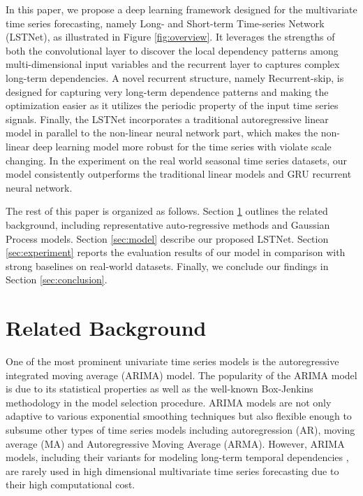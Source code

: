 \documentclass[sigconf]{acmart}
\begin{document}
In this paper, we propose a deep learning framework designed for the multivariate time series forecasting, namely Long- and Short-term Time-series Network (LSTNet), as illustrated in Figure \ref{fig:overview}. It leverages the strengths of both the convolutional layer to discover the local dependency patterns among multi-dimensional input variables and the recurrent layer to captures complex long-term dependencies. A novel recurrent structure, namely Recurrent-skip, is designed for capturing very long-term dependence patterns and making the optimization easier as it utilizes the periodic property of the input time series signals. Finally, the LSTNet incorporates a traditional autoregressive linear model in parallel to the non-linear neural network part, which makes the non-linear deep learning model more robust for the time series with violate scale changing. In the experiment on the real world seasonal time series datasets, our model consistently outperforms the traditional linear models and GRU recurrent neural network.  

     
     The rest of this paper is organized as follows. Section \ref{sec:related} outlines the related background, including representative auto-regressive methods and Gaussian Process models. Section \ref{sec:model} describe our proposed LSTNet. Section \ref{sec:experiment} reports the evaluation results of our model in comparison with strong baselines on real-world datasets. Finally, we conclude our findings in Section \ref{sec:conclusion}.
       
      \section{Related Background}
\label{sec:related}



One of the most prominent univariate time series models is the autoregressive integrated moving average (ARIMA) model. The popularity of the ARIMA model is due to its statistical properties as well as the well-known Box-Jenkins methodology \cite{box2015time} in the model selection procedure. ARIMA models are not only adaptive to various exponential smoothing techniques \cite{mckenzie1984general} but also flexible enough to subsume other types of time series models including autoregression (AR), moving average (MA) and Autoregressive Moving Average (ARMA). However, ARIMA models, including their variants for modeling long-term temporal dependencies \cite{box2015time}, are rarely used in high dimensional multivariate time series forecasting due to their high computational cost. 
\end{document}
